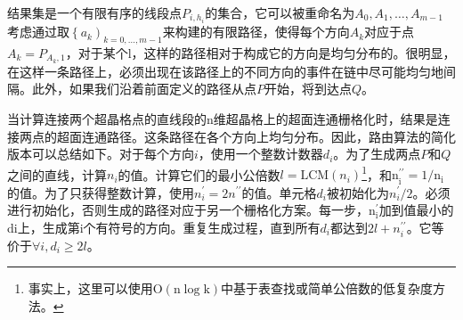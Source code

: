 \begin{CJK}{UTF8}{gbsn}
结果集是一个有限有序的线段点$P_{i, h_{i}}$的集合，它可以被重命名为$A_{0}, A_{1}, \ldots, A_{m-1}$ 考虑通过取$\left\{a_{k}\right)_{k=0, \ldots, m-1}$来构建的有限路径，使得每个方向$A_{k} $对应于点$A_{k}=P_{A_{k}, 1}$，对于某个l，这样的路径相对于构成它的方向是均匀分布的。很明显，在这样一条路径上，必须出现在该路径上的不同方向的事件在链中尽可能均匀地间隔。此外，如果我们沿着前面定义的路径从点$P$开始，将到达点$Q$。

当计算连接两个超晶格点的直线段的n维超晶格上的超面连通栅格化时，结果是连接两点的超面连通路径。这条路径在各个方向上均匀分布。因此，路由算法的简化版本可以总结如下。对于每个方向$i$，使用一个整数计数器$d_{i}$。为了生成两点$P$和$Q$之间的直线，计算$n_{i}$的值。计算它们的最小公倍数$l=\mathrm{LCM}\left(n_{i}\right)$\footnote{事实上，这里可以使用$\mathrm{O}(\mathrm{n} \log \mathrm{k})$中基于表查找或简单公倍数的低复杂度方法。}，和$\mathrm{n}_{\mathrm{i}}^{\prime \prime}=1 / \mathrm{n}_{\mathrm{i}}$的值。为了只获得整数计算，使用$n_{i}^{\prime}=2 n^{\prime \prime}$的值。单元格$d_{i}$被初始化为$n_{i}^{\prime} / 2$。必须进行初始化，否则生成的路径对应于另一个栅格化方案。每一步，$\mathrm{n}_{\mathrm{i}}^{\prime}$加到值最小的di上，生成第i个有符号的方向。重复生成过程，直到所有$d_{i}$都达到$ 2l +n_{i}^{\prime \prime}$。它等价于$\forall i, d_{i} \geq 2 l$。


\end{CJK}